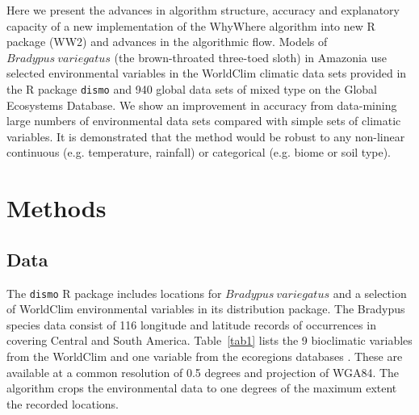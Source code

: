 \documentclass[10pt]{article}
\begin{document}
Here we present the advances in algorithm structure, accuracy and explanatory capacity of a new implementation of the WhyWhere algorithm into new R package (WW2) and advances in the algorithmic flow. Models of $Bradypus~variegatus$ (the brown-throated three-toed sloth) in Amazonia use selected environmental variables in the WorldClim climatic data sets provided in the R package \texttt{dismo} and 940 global data sets of mixed type on the Global Ecosystems Database.  We show an improvement in accuracy from data-mining large numbers of environmental data sets compared with simple sets of climatic variables. It is demonstrated that the method would be robust to any non-linear continuous (e.g. temperature, rainfall) or categorical (e.g. biome or soil type).  

\section{Methods} 

\subsection{Data}

The \texttt{dismo} R package includes locations for  $Bradypus~variegatus$ and a selection of WorldClim environmental variables in its distribution package.  The Bradypus species data consist of 116 longitude and latitude records of occurrences in covering Central and South America.  Table~\ref{tab1} lists the 9 bioclimatic variables from the WorldClim and one variable from the ecoregions databases \cite{Hijmans2005, Olson2001}. These are available at a common resolution of 0.5 degrees and projection of WGA84.  The algorithm crops the environmental data to one degrees of the maximum extent the recorded locations. 
\end{document}
